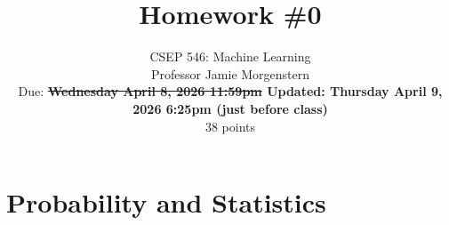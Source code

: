 \documentclass{article}
\begin{document}
\setcounter{aprob}{0}
\setcounter{bprob}{0}
\title{Homework \#0}
\author{
    \normalsize{CSEP 546: Machine Learning}\\
    \normalsize{Professor Jamie Morgenstern}\\
    \normalsize{Due: \textbf{\sout{Wednesday April 8, 2026 11:59pm} \; Updated: Thursday April 9, 2026 6:25pm (just before class)}}\\
    \normalsize{38 points}
}
\date{{}}
\maketitle

\section*{Probability and Statistics}
\end{document}
